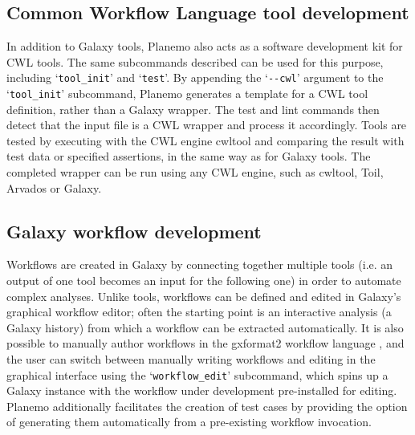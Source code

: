 \subsection*{Common Workflow Language tool development}

In addition to Galaxy tools, Planemo also acts as a software development
kit for CWL tools. The same subcommands described can be used for this
purpose, including `\texttt{tool\_init}' and `\texttt{test}'. By
appending the `\texttt{-\/-cwl}' argument to the `\texttt{tool\_init}'
subcommand, Planemo generates a template for a CWL tool definition,
rather than a Galaxy wrapper. The test and lint commands then detect
that the input file is a CWL wrapper and process it accordingly. Tools
are tested by executing with the CWL engine cwltool and comparing the
result with test data or specified assertions, in the same way as for
Galaxy tools. The completed wrapper can be run using any CWL engine,
such as cwltool, Toil, Arvados \cite{Arvados_2022} or Galaxy.

\subsection*{Galaxy workflow development}

Workflows are created in Galaxy by connecting together multiple tools
(i.e. an output of one tool becomes an input for the following one) in
order to automate complex analyses. Unlike tools, workflows can be
defined and edited in Galaxy's graphical workflow editor; often the
starting point is an interactive analysis (a Galaxy history) from which
a workflow can be extracted automatically. It is also possible to
manually author workflows in the gxformat2 workflow language \cite{gxformat2_2022},
and the user can switch between manually writing workflows and editing
in the graphical interface using the `\texttt{workflow\_edit}'
subcommand, which spins up a Galaxy instance with the workflow under
development pre-installed for editing. Planemo additionally facilitates
the creation of test cases by providing the option of generating them
automatically from a pre-existing workflow invocation.

